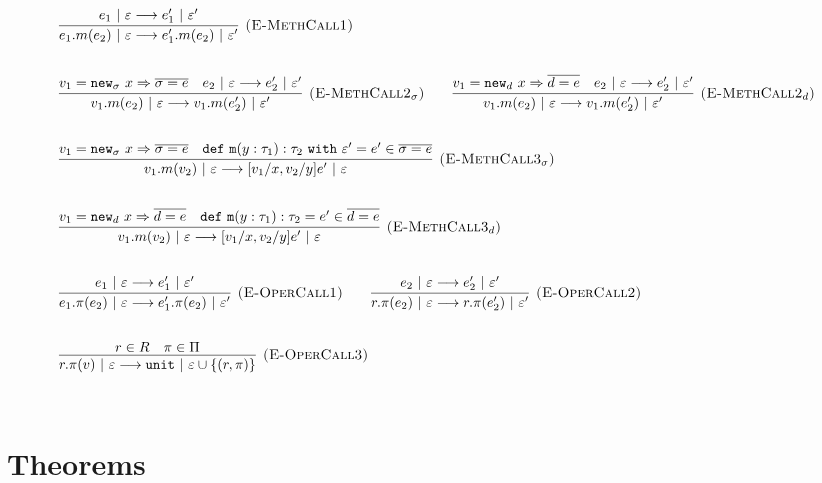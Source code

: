 \documentclass{llncs}
\newcommand{\keywadj}[1]{\mathtt{#1}}
\newcommand{\keyw}[1]{\keywadj{#1}~}
\begin{document}
\[
\begin{array}{lll}
	\infer[\textsc{(E-MethCall1)}]
		{e_1.m(e_2)~|~\varepsilon \longrightarrow e_1'.m(e_2)~|~\varepsilon'}
		{e_1~|~\varepsilon \longrightarrow e_1'~|~\varepsilon'}\\[5ex]

	\infer[\textsc{(E-MethCall2$_{\sigma}$)}]
		{v_1.m(e_2)~|~\varepsilon \longrightarrow v_1.m(e_2')~|~\varepsilon'}
		{v_1 = \keywadj{new}_{\sigma}~x \Rightarrow \overline{\sigma = e} & e_2~|~\varepsilon \longrightarrow e_2'~|~\varepsilon'}
				
		~~~~~~
	\infer[\textsc{(E-MethCall2$_d$)}]
		{v_1.m(e_2)~|~\varepsilon \longrightarrow v_1.m(e_2')~|~\varepsilon'}
		{v_1 = \keywadj{new}_{d}~x \Rightarrow \overline{d = e} & e_2~|~\varepsilon \longrightarrow e_2'~|~\varepsilon'}
		\\[5ex]
		
	\infer[\textsc{(E-MethCall3$_{\sigma}$)}]
		{v_1.m(v_2)~|~\varepsilon
			\longrightarrow
		 [v_1/x, v_2/y]e'~|~\varepsilon}
  		{v_1 = \keywadj{new}_{\sigma}~x \Rightarrow \overline{\sigma = e} & \keywadj{def~m}(y: \tau_1) : \tau_2~\keyw{with} \varepsilon' = e' \in \overline {\sigma = e}} \\[5ex]

	\infer[\textsc{(E-MethCall3$_{d}$)}]
		{v_1.m(v_2)~|~\varepsilon
			\longrightarrow
		 [v_1/x, v_2/y]e'~|~\varepsilon}
  		{v_1 = \keywadj{new}_{d}~x \Rightarrow \overline{d = e} & \keywadj{def~m}(y: \tau_1) : \tau_2 = e' \in \overline {d = e}} \\[5ex]
			
	\infer[\textsc{(E-OperCall1)}]
		{e_1.\pi(e_2)~|~\varepsilon
			\longrightarrow
		 e_1'.\pi(e_2)~|~\varepsilon'}
		{e_1~|~\varepsilon \longrightarrow e_1'~|~\varepsilon'}
~~~~~~
			\infer[\textsc{(E-OperCall2)}]
		{r.\pi(e_2)~|~\varepsilon
			\longrightarrow
		 r.\pi(e_2')~|~\varepsilon'}
		{e_2~|~\varepsilon \longrightarrow e_2'~|~\varepsilon'} \\[5ex]
			
			\infer[\textsc{(E-OperCall3)}]
		{r.\pi(v)~|~\varepsilon
			\longrightarrow
		 \keywadj{unit}~|~\varepsilon \cup \{(r, \pi)\}}
		{r \in R & \pi \in \Pi} \\[5ex]
			
		
\end{array}
\]

\newpage

\section{Theorems}
\end{document}
